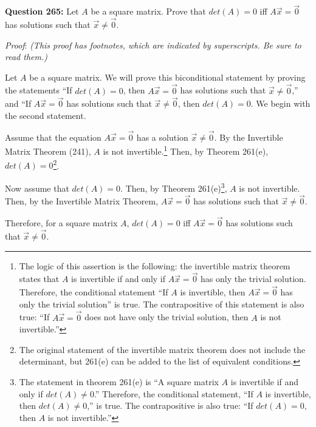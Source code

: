 \documentclass{exam}
\begin{document}
\textbf{Question 265:} Let $A$ be a square matrix. Prove that $det(A)=0$ iff $A\Vec{x}=\Vec{0}$ has solutions such that $\Vec{x}\neq\Vec{0}$.\newline
\vspace{0.1in}
\newline

\textit{Proof}:  \textit{(This proof has footnotes, which are indicated by superscripts. Be sure to read them.)}

Let $A$ be a square matrix. We will prove this biconditional statement by proving the statements ``If $det(A)=0$, then $A\Vec{x}=\Vec{0}$ has solutions such that $\Vec{x}\neq\Vec{0}$,'' and ``If $A\Vec{x}=\Vec{0}$ has solutions such that $\Vec{x}\neq\Vec{0}$, then $det(A)=0$. We begin with the second statement. 

Assume that the equation $A\Vec{x}=\Vec{0}$ has a solution $\Vec{x}\neq\Vec{0}$. By the Invertible Matrix Theorem (241), $A$ is not invertible.\footnote{The logic of this assertion is the following: the invertible matrix theorem states that $A$ is invertible if and only if $A\Vec{x}=\Vec{0}$ has only the trivial solution. Therefore, the conditional statement ``If $A$ is invertible, then $A\Vec{x}=\Vec{0}$ has only the trivial solution'' is true. The contrapositive of this statement is also true: ``If $A\Vec{x}=\Vec{0}$ does not have only the trivial solution, then $A$ is not invertible.''} Then, by Theorem 261(e), $det(A)=0$\footnote{The original statement of the invertible matrix theorem does not include the determinant, but 261(e) can be added to the list of equivalent conditions.}.

Now assume that $det(A)=0$. Then, by Theorem 261(e)\footnote{The statement in theorem 261(e) is ``A square matrix $A$ is invertible if and only if $det(A)\neq 0$.'' Therefore, the conditional statement, ``If $A$ is invertible, then $det(A)\neq 0$,'' is true. The contrapositive is also true: ``If $det(A)=0$, then $A$ is not invertible.''}, $A$ is not invertible. Then, by the Invertible Matrix Theorem,  $A\Vec{x}=\Vec{0}$ has solutions such that $\Vec{x}\neq\Vec{0}$.

Therefore, for a square matrix $A$, $det(A)=0$ iff $A\Vec{x}=\Vec{0}$ has solutions such that $\Vec{x}\neq\Vec{0}$.
\end{document}
